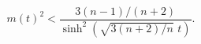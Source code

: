 \begin{equation}  \label{acc}
	    m(t)^2 < \frac{3(n-1)/(n+2)}{\sinh^2
	    \left(\sqrt{3(n+2)/n}\,\, t\right)}.  \end{equation} 
